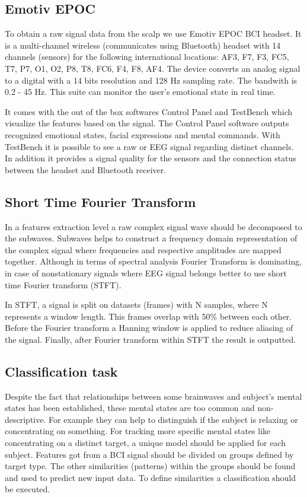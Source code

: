 \documentclass[12pt]{article}
\begin{document}
\subsection{Emotiv EPOC}

To obtain a raw signal data from the scalp we use Emotiv EPOC BCI headset. It is a multi-channel wireless (communicates using Bluetooth) headset with 14 channels (sensors) for the following international locations: AF3, F7, F3, FC5, T7, P7, O1, O2, P8, T8, FC6, F4, F8, AF4. The device converts an analog signal to a digital with a 14 bits resolution and 128 Hz sampling rate. The bandwith is 0.2 - 45 Hz. This suite can monitor the user's emotional state in real time.\cite{emotiv}

It comes with the out of the box softwares Control Panel and TestBench which visualize the features based on the signal. The Control Panel software outputs recognized emotional states, facial expressions and mental commands. With TestBench it is possible to see a raw or EEG signal regarding distinct channels. In addition it provides a signal quality for the sensors and the connection status between the headset and Bluetooth receiver.
\subsection{Short Time Fourier Transform}

In a features extraction level a raw complex signal wave should be decomposed to the subwaves. Subwaves helps to construct a frequency domain representation of the complex signal where frequencies and respective amplitudes are mapped together. Although in terms of spectral analysis Fourier Transform is dominating, in case of nonstationary signals where EEG signal belongs better to use short time Fourier transform (STFT).\cite{alfahoum_fft}

In STFT, a signal is split on datasets (frames) with N samples, where N represents a window length. This frames overlap with 50\% between each other. Before the Fourier transform a Hanning window is applied to reduce aliasing of the signal. Finally, after Fourier transform within STFT the result is outputted.

\subsection{Classification task}

Despite the fact that relationships between some brainwaves and subject's mental states has been established, these mental states are too common and non-descriptive. For example they can help to distinguish if the subject is relaxing or concentrating on something. For tracking more specific mental states like concentrating on a distinct target, a unique model should be applied for each subject. Features got from a BCI signal should be divided on groups defined by target type. The other similarities (patterns) within the groups should be found and used to predict new input data. To define similarities a classification should be executed.
\end{document}
